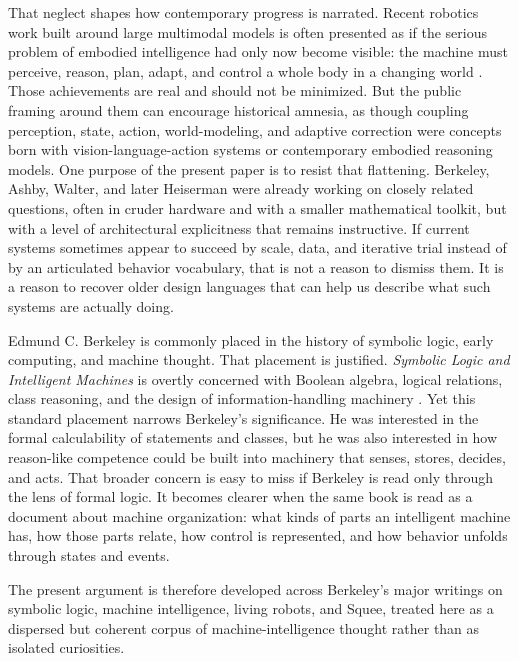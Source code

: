 \documentclass[11pt]{article}
\begin{document}
That neglect shapes how contemporary progress is narrated. Recent robotics work built around large multimodal models is often presented as if the serious problem of embodied intelligence had only now become visible: the machine must perceive, reason, plan, adapt, and control a whole body in a changing world \citep{googledeepmind2025geminirobotics,googledeepmind2026geminier}. Those achievements are real and should not be minimized. But the public framing around them can encourage historical amnesia, as though coupling perception, state, action, world-modeling, and adaptive correction were concepts born with vision-language-action systems or contemporary embodied reasoning models. One purpose of the present paper is to resist that flattening. Berkeley, Ashby, Walter, and later Heiserman were already working on closely related questions, often in cruder hardware and with a smaller mathematical toolkit, but with a level of architectural explicitness that remains instructive. If current systems sometimes appear to succeed by scale, data, and iterative trial instead of by an articulated behavior vocabulary, that is not a reason to dismiss them. It is a reason to recover older design languages that can help us describe what such systems are actually doing.

Edmund C. Berkeley is commonly placed in the history of symbolic logic, early computing, and machine thought. That placement is justified. \emph{Symbolic Logic and Intelligent Machines} is overtly concerned with Boolean algebra, logical relations, class reasoning, and the design of information-handling machinery \citep{berkeley1959symbolic}. Yet this standard placement narrows Berkeley's significance. He was interested in the formal calculability of statements and classes, but he was also interested in how reason-like competence could be built into machinery that senses, stores, decides, and acts. That broader concern is easy to miss if Berkeley is read only through the lens of formal logic. It becomes clearer when the same book is read as a document about machine organization: what kinds of parts an intelligent machine has, how those parts relate, how control is represented, and how behavior unfolds through states and events.

The present argument is therefore developed across Berkeley's major writings on symbolic logic, machine intelligence, living robots, and Squee, treated here as a dispersed but coherent corpus of machine-intelligence thought rather than as isolated curiosities.
\end{document}
